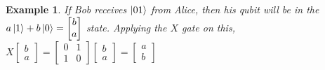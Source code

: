 \documentclass[12pt,twoside,fleqn]{report}
\theoremstyle{thmstyle}
\newtheorem{eg}{Example}[chapter]
\begin{document}
\begin{eg}
If Bob receives $\ket{01}$ from Alice, then his qubit will be in the $a \ket{1} + b \ket{0} = \begin{bmatrix} b \\ a \end{bmatrix}$ state.
    Applying the $X$ gate on this, $X \begin{bmatrix} b \\ a \end{bmatrix} = \begin{bmatrix} 0 & 1 \\ 1 & 0 \end{bmatrix} \begin{bmatrix} b \\ a \end{bmatrix} = \begin{bmatrix} a \\ b \end{bmatrix}$
\end{eg}
\end{document}
